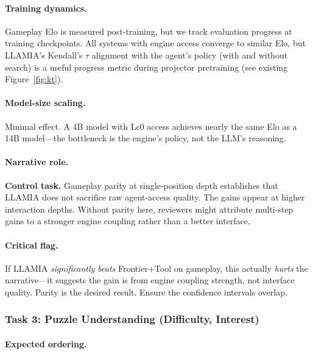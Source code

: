 \paragraph{Training dynamics.}
Gameplay Elo is measured post-training, but we track evaluation
progress at training checkpoints. All systems with engine access
converge to similar Elo, but LLAMIA's Kendall's $\tau$ alignment
with the agent's policy (with and without search) is a useful
progress metric during projector pretraining (see existing
Figure~\ref{fig:kt}).

\paragraph{Model-size scaling.}
Minimal effect. A 4B model with Lc0 access achieves nearly the same
Elo as a 14B model---the bottleneck is the engine's policy, not the
LLM's reasoning.

\paragraph{Narrative role.}
\textbf{Control task.} Gameplay parity at single-position depth
establishes that LLAMIA does not sacrifice raw agent-access quality.
The gains appear at higher interaction depths. Without parity here,
reviewers might attribute multi-step gains to a stronger engine
coupling rather than a better interface.

\paragraph{Critical flag.}
If LLAMIA \emph{significantly beats} Frontier+Tool on gameplay, this
actually \emph{hurts} the narrative---it suggests the gain is from
engine coupling strength, not interface quality. Parity is the
desired result. Ensure the confidence intervals overlap.

\subsubsection*{Task 3: Puzzle Understanding (Difficulty, Interest)}
\label{sec:perf_puzzle}

\paragraph{Expected ordering.}

